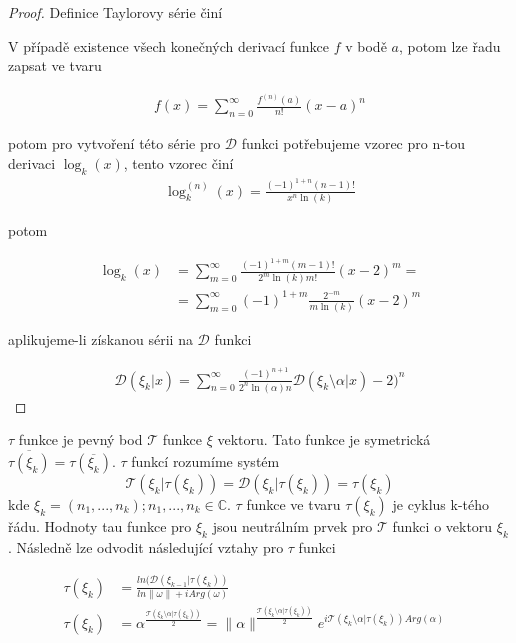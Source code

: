 \begin{proof}
      Definice Taylorovy série činí
      \begin{definition}
            V případě existence všech konečných derivací
            funkce \(f\) v bodě \(a\), potom lze řadu zapsat ve tvaru

            \begin{align}
                  f(x) = \sum_{n=0}^\infty \frac{f^{(n)}(a)}{n!}(x-a)^n
            \end{align}
            
      \end{definition}
            potom pro vytvoření této série pro \(\mathcal{D}\) 
            funkci potřebujeme vzorec pro n-tou derivaci \(\log_k(x)\), tento vzorec činí
      \begin{align}
            \log_k^{(n)}(x) = \frac{(-1)^{1+n}(n-1)!}{x^n \ln(k)}
      \end{align}
      
      potom
      
      \begin{align}
            \log_k(x) &= \sum_{m=0}^\infty
            \frac{(-1)^{1+m}(m-1)!}{2^m 
            \ln(k) m!}(x-2)^m = \\
            & = \sum_{m=0}^\infty (-1)^{1+m}
            \frac{2^{-m}}{m \ln(k)}(x-2)^m 
      \end{align}
      
      aplikujeme-li získanou sérii na \(\mathcal{D}\) funkci
      
      \begin{align}
            \mathcal{D}(\xi_k | x) = \sum_{n=0}^\infty 
            \frac{(-1)^{n+1}}{2^n \ln(\alpha) n}\mathcal{D}(\xi_k
            \setminus \alpha | x) - 2 )^n
      \end{align}
\end{proof}

\begin{definition}
      \(\tau\) funkce je pevný bod \(\mathcal{T}\) funkce \(\xi\) 
      vektoru. Tato funkce je symetrická \(\overline{\tau(\xi_k)}=
      \tau(\overline{\xi_k})\). \(\tau\) funkcí rozumíme systém
      \[\mathcal{T}(\xi_k | \tau(\xi_k)) = \mathcal{D}(\xi_k | 
      \tau(\xi_k)) = \tau(\xi_k)\]
      kde \(\xi_k = (n_1, ..., n_k); n_1, ..., n_k \in \mathbb{C}\). 
      \(\tau\) funkce ve tvaru \(\tau(\xi_k)\) je cyklus k-tého řádu.
      Hodnoty tau funkce pro \(\xi_k\) jsou neutrálním prvek pro 
      \(\mathcal{T}\) funkci o vektoru \(\xi_k\). Následně lze
      odvodit následující vztahy pro \(\tau\) funkci

      \begin{align}
            \tau(\xi_k) &= \frac{ln(\mathcal{D}(\xi_{k-1}|\tau(\xi_k
            ))}{ln\|\omega\| + iArg(\omega)} & \\
            \tau(\xi_k) &= \alpha^{\frac{\mathcal{T}(\xi_k \setminus 
            \alpha | \tau(\xi_k))}{2}}= \|\alpha\|^{\frac{\mathcal{T}(
            \xi_k \setminus \alpha | \tau(\xi_k))}{2}} e^{i\mathcal{T}(
            \xi_k \setminus \alpha | \tau(\xi_k))Arg(\alpha)} 
      \label{4}
      \end{align}
\end{definition}

